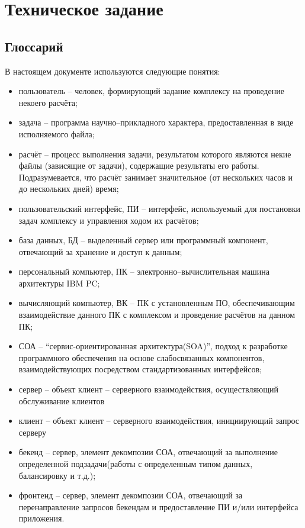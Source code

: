 \documentclass[a4paper,12pt]{report}
\date{\today}
\numberwithin{equation}{section}
\begin{document}
\section{Техническое задание}
\subsection{Глоссарий}
В настоящем документе используются следующие понятия:
\begin{itemize}
  \item пользователь -- человек, формирующий задание комплексу на проведение некоего расчёта;
  \item задача -- программа научно--прикладного характера, предоставленная в виде исполняемого файла;
  \item расчёт -- процесс выполнения задачи, результатом которого являются некие файлы (зависящие от задачи), содержащие результаты его работы. Подразумевается, что расчёт занимает значительное (от нескольких часов и до нескольких дней) время;
  \item пользовательский интерфейс, ПИ -- интерфейс, используемый для постановки задач комплексу и управления ходом их расчётов;
  \item база данных, БД -- выделенный сервер или программный компонент, отвечающий за хранение и доступ к данным;
  \item персональный компьютер, ПК -- электронно--вычислительная машина архитектуры IBM PC;
  \item вычисляющий компьютер, ВК -- ПК с установленным ПО, обеспечивающим взаимодействие данного ПК с комплексом и проведение расчётов на данном ПК;
  \item СОА -- ``сервис-ориентированная архитектура(SOA)'', подход к разработке программного обеспечения на основе слабосвязанных компонентов, взаимодействующих посредством стандартизованных интерфейсов;
  \item сервер -- объект клиент -- серверного взаимодействия, осуществляющий обслуживание клиентов
  \item клиент -- объект клиент -- серверного взаимодействия, инициирующий запрос серверу
  \item бекенд -- сервер, элемент декомпозии СОА, отвечающий за выполнение определенной подзадачи(работы с определенным типом данных, балансировку и т.д.);
  \item фронтенд -- сервер, элемент декомпозии СОА, отвечающий за перенаправление запросов бекендам и предоставление ПИ и/или интерфейса приложения.
\end{itemize}
\end{document}
